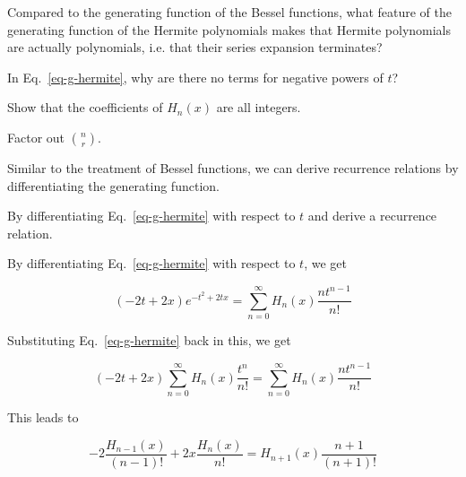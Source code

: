\pagebreak

\begin{exer}
Compared to the generating function of the Bessel functions, what feature of the generating function of the Hermite polynomials makes that Hermite polynomials are actually polynomials, i.e. that their series expansion terminates?
\end{exer}

\begin{exer}
In Eq.~\ref{eq-g-hermite}, why are there no terms for negative powers of $t$?
\end{exer}

\begin{exer}
Show that the coefficients of $H_n(x)$ are all integers.
\begin{hnt}
Factor out $n \choose r$.  
\end{hnt}
\end{exer}

\pagebreak



Similar to the treatment of Bessel functions, we can derive recurrence relations by differentiating the generating function.

\begin{cue}
By differentiating Eq.~\ref{eq-g-hermite} with respect to $t$ and derive a recurrence relation.
\end{cue}
 
By differentiating Eq.~\ref{eq-g-hermite} with respect to $t$, we get

\begin{equation}
(-2t+2x)e^{-t^2 + 2tx} = \sum_{n = 0}^{\infty} H_n(x) \frac{nt^{n-1}}{n!}
\end{equation} 

Substituting Eq.~\ref{eq-g-hermite} back in this, we get

\begin{equation}
(-2t+2x) \sum_{n = 0}^{\infty} H_n(x)\frac{t^n}{n!} = \sum_{n = 0}^{\infty} H_n(x) \frac{nt^{n-1}}{n!}
\end{equation} 

\noindent{}This leads to

\begin{equation}
-2  \frac{H_{n-1}(x)}{(n-1)!} + 2 x \frac{H_n(x)}{n!} = H_{n+1}(x) \frac{n+1}{(n+1)!}
\end{equation} 

